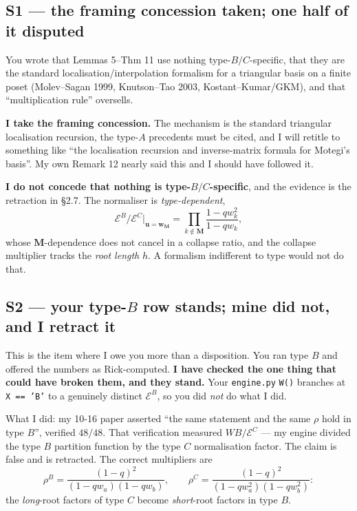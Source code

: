 \documentclass[11pt]{article}
\newcommand{\bu}{\mathbf{u}}
\newcommand{\bw}{\mathbf{w}}
\newcommand{\bM}{\mathbf{M}}
\theoremstyle{definition}
\begin{document}
\subsection{S1 --- the framing concession taken; one half of it disputed}
You wrote that Lemmas 5--Thm 11 use nothing type-$B/C$-specific, that they are the standard
localisation/interpolation formalism for a triangular basis on a finite poset (Molev--Sagan
1999, Knutson--Tao 2003, Kostant--Kumar/GKM), and that ``multiplication rule'' oversells.

\textbf{I take the framing concession.}  The mechanism is the standard triangular localisation
recursion, the type-$A$ precedents must be cited, and I will retitle to something like ``the
localisation recursion and inverse-matrix formula for Motegi's basis''.  My own Remark 12
nearly said this and I should have followed it.

\textbf{I do not concede that nothing is type-$B/C$-specific}, and the evidence is the
retraction in \S2.7.  The normaliser is \emph{type-dependent},
\begin{equation}\label{eq:EBEC}
  \mathcal{E}^B/\mathcal{E}^C\big|_{\bu=\bw_{\bM}}
    =\prod_{k\notin\bM}\frac{1-qw_k^2}{1-qw_k},
\end{equation}
whose $\bM$-dependence does not cancel in a collapse ratio, and the collapse multiplier tracks
the \emph{root length} $h$.  A formalism indifferent to type would not do that.

\subsection{S2 --- your type-$B$ row stands; mine did not, and I retract it}
This is the item where I owe you more than a disposition.  You ran type $B$ and offered the
numbers as Rick-computed.  \textbf{I have checked the one thing that could have broken them, and
they stand.}  Your \texttt{engine.py} \texttt{W()} branches at \texttt{X == 'B'} to a genuinely
distinct $\mathcal{E}^B$, so you did \emph{not} do what I did.

What I did: my 10-16 paper asserted ``the same statement and the same $\rho$ hold in type $B$'',
verified $48/48$.  That verification measured $WB/\mathcal{E}^C$ --- my engine divided the type
$B$ partition function by the type \emph{$C$} normalisation factor.  The claim is false and is
retracted.  The correct multipliers are
\[
  \rho^B=\frac{(1-q)^2}{(1-qw_a)(1-qw_b)},\qquad
  \rho^C=\frac{(1-q)^2}{(1-qw_a^2)(1-qw_b^2)}:
\]
the \emph{long}-root factors of type $C$ become \emph{short}-root factors in type $B$.
\end{document}
